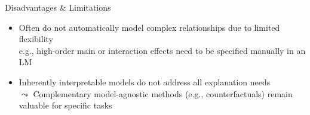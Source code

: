 \documentclass[10pt,compress,t,notes=noshow, xcolor=table]{beamer}
\begin{document}
\begin{frame}{Disadvantages \& Limitations}
\begin{itemize}
\itemsep1em
        \item<3-> 
        Often do not automatically model complex relationships due to limited flexibility %
        \\
        e.g., high-order main or interaction effects need to be specified manually in an LM

     \item<4-> Inherently interpretable models do not address all explanation needs\\
$\leadsto$ Complementary model-agnostic methods (e.g., counterfactuals) remain valuable for specific tasks
\end{itemize}
\end{frame}
\end{document}
